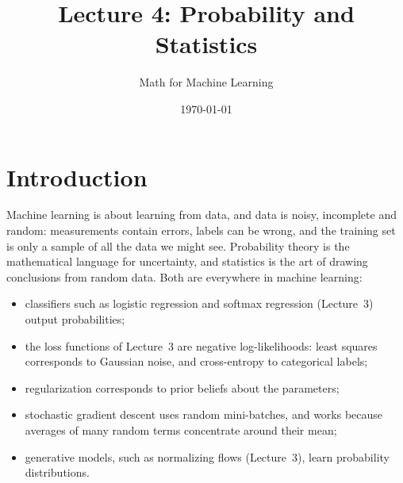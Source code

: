 \documentclass[11pt]{article}
\title{Lecture 4: Probability and Statistics}
\author{Math for Machine Learning}
\date{\today}
\theoremstyle{definition}
\theoremstyle{plain}
\theoremstyle{remark}
\begin{document}
\maketitle
\tableofcontents

\section*{Introduction}

Machine learning is about learning from data, and data is noisy, incomplete and random: measurements contain errors, labels can be wrong, and the training set is only a sample of all the data we might see. Probability theory is the mathematical language for uncertainty, and statistics is the art of drawing conclusions from random data. Both are everywhere in machine learning:
\begin{itemize}
    \item classifiers such as logistic regression and softmax regression (Lecture~3) output probabilities;
    \item the loss functions of Lecture~3 are negative log-likelihoods: least squares corresponds to Gaussian noise, and cross-entropy to categorical labels;
    \item regularization corresponds to prior beliefs about the parameters;
    \item stochastic gradient descent uses random mini-batches, and works because averages of many random terms concentrate around their mean;
    \item generative models, such as normalizing flows (Lecture~3), learn probability distributions.
\end{itemize}
\end{document}
